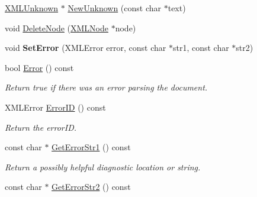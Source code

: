 \begin{DoxyCompactItemize}
\item 
\hyperlink{classtinyxml2_1_1XMLUnknown}{X\+M\+L\+Unknown} $\ast$ \hyperlink{classtinyxml2_1_1XMLDocument_a4954f502c5fd7f49de54c3c0c99bb73d}{New\+Unknown} (const char $\ast$text)
\item 
void \hyperlink{classtinyxml2_1_1XMLDocument_ac1d6e2c7fcc1a660624ac4f68e96380d}{Delete\+Node} (\hyperlink{classtinyxml2_1_1XMLNode}{X\+M\+L\+Node} $\ast$node)
\item 
\mbox{\label{classtinyxml2_1_1XMLDocument_ae38d194e47336e4c96677ac77e2ac5d4}} 
void {\bfseries Set\+Error} (X\+M\+L\+Error error, const char $\ast$str1, const char $\ast$str2)
\item 
\mbox{\label{classtinyxml2_1_1XMLDocument_a34e6318e182e40e3cc4f4ba5d59ed9ed}} 
bool \hyperlink{classtinyxml2_1_1XMLDocument_a34e6318e182e40e3cc4f4ba5d59ed9ed}{Error} () const
\begin{DoxyCompactList}\small\item\em Return true if there was an error parsing the document. \end{DoxyCompactList}\item 
\mbox{\label{classtinyxml2_1_1XMLDocument_afa3ed33b3107f920ec2b301f805ac17d}} 
X\+M\+L\+Error \hyperlink{classtinyxml2_1_1XMLDocument_afa3ed33b3107f920ec2b301f805ac17d}{Error\+ID} () const
\begin{DoxyCompactList}\small\item\em Return the error\+ID. \end{DoxyCompactList}\item 
\mbox{\label{classtinyxml2_1_1XMLDocument_a229494e30e5473237f3fa547eee4c43f}} 
const char $\ast$ \hyperlink{classtinyxml2_1_1XMLDocument_a229494e30e5473237f3fa547eee4c43f}{Get\+Error\+Str1} () const
\begin{DoxyCompactList}\small\item\em Return a possibly helpful diagnostic location or string. \end{DoxyCompactList}\item 
\mbox{\label{classtinyxml2_1_1XMLDocument_a2d952f49c761bffd2903250680a8716b}} 
const char $\ast$ \hyperlink{classtinyxml2_1_1XMLDocument_a2d952f49c761bffd2903250680a8716b}{Get\+Error\+Str2} () const

\end{DoxyCompactItemize}
